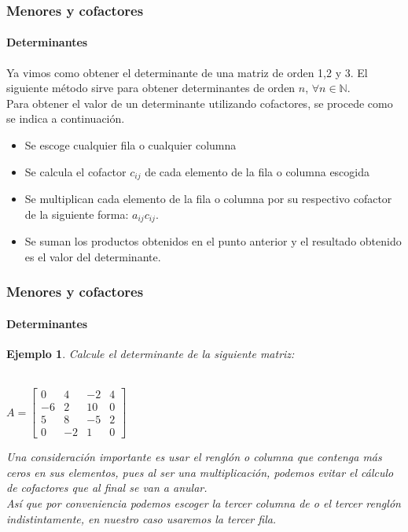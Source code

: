 \documentclass[11pt]{beamer}
\newtheorem{ejem}{Ejemplo}
\begin{document}
\begin{frame}
\frametitle{Menores y cofactores}
\framesubtitle{Determinantes}
Ya vimos como obtener el determinante de una matriz de orden 1,2 y 3.
El siguiente método sirve para obtener determinantes de orden $n$, $\forall n\in \mathbb{N}$.\\
Para obtener el valor de un determinante utilizando cofactores, se procede como se indica a  continuación.
\begin{itemize}
\item Se escoge cualquier fila o cualquier columna
\item Se calcula el cofactor $c_{ij}$ de cada elemento de la fila o columna escogida
\item Se multiplican cada elemento de la fila o columna por su respectivo cofactor de la siguiente forma: $a_{ij}c_{ij}$.
\item Se suman los productos obtenidos en el punto anterior y el resultado obtenido es el valor del determinante.
\end{itemize}
\end{frame}

\begin{frame}
\frametitle{Menores y cofactores}
\framesubtitle{Determinantes}
\begin{ejem}
Calcule el determinante de la siguiente matriz:\\ \hspace{0cm} \\
\begin{center}
${\displaystyle A = {\begin{bmatrix}0&4&-2&4\\-6&2&10&0\\5&8&-5&2\\0&-2&1&0\end{bmatrix}}}$
\end{center}
Una consideración importante es usar el renglón o columna que contenga más ceros en sus elementos, pues al ser una multiplicación, podemos evitar el cálculo de cofactores que al final se van a anular.\\
Así que por conveniencia podemos escoger la tercer columna de o el tercer renglón indistintamente, en nuestro caso usaremos la tercer fila.
\end{ejem}
\end{frame}
\end{document}
